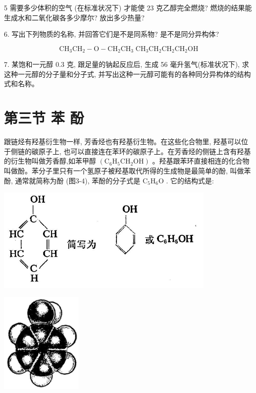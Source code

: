 \documentclass[10pt]{article}
\begin{document}
5 需要多少体积的空气 (在标准状况下) 才能使 23 克乙醇完全燃烧? 燃烧的结果能生成水和二氧化碳各多少摩尔? 放出多少热量?

6. 写出下列物质的名称, 并回答它们是不是同系物? 是不是同分异构体?

\[
{\mathrm{{CH}}}_{3}{\mathrm{{CH}}}_{2} - \mathrm{O} - {\mathrm{{CH}}}_{2}{\mathrm{{CH}}}_{3}\;{\mathrm{{CH}}}_{3}{\mathrm{{CH}}}_{2}{\mathrm{{CH}}}_{2}{\mathrm{{CH}}}_{2}\mathrm{{OH}}
\]

7. 某饱和一元醇 0.3 克, 跟足量的钠起反应后, 生成 56 毫升氢气(标准状况下), 求这种一元醇的分子量和分子式, 并写出这种一元醇可能有的各种同分异构体的结构式和名称。

\section*{第三节 苯 酚}

跟链烃有羟基衍生物一样, 芳香烃也有羟基衍生物。在这些化合物里, 羟基可以位于侧链的碳原子上, 也可以直接连在苯环的碳原子上。在芳香烃的侧链上含有羟基的衍生物叫做芳香醇,如苯甲醇 \(\left( {{\mathrm{C}}_{6}{\mathrm{H}}_{5}{\mathrm{{CH}}}_{2}\mathrm{{OH}}}\right)\) 。羟基跟苯环直接相连的化合物叫做酚。苯分子里只有一个氢原子被羟基取代所得的生成物是最简单的酚, 叫做苯酚, 通常就简称为酚 (图3-4), 苯酚的分子式是 \({\mathrm{C}}_{5}{\mathrm{H}}_{6}\mathrm{O}\) . 它的结构式是:

\begin{center}
\includegraphics[max width=0.8\textwidth]{images/01912d16-be99-77bb-9535-4f3ed8d9946f_121_799576.jpg}
\end{center}

\begin{center}
\includegraphics[max width=0.3\textwidth]{images/01912d16-be99-77bb-9535-4f3ed8d9946f_122_272955.jpg}
\end{center}
\end{document}
